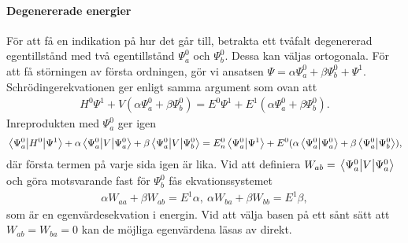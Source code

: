 \paragraph{Degenererade energier}
För att få en indikation på hur det går till, betrakta ett tvåfalt degenererad egentillstånd med två egentillstånd $\Psi_{a}^{0}$ och $\Psi_{b}^{0}$. Dessa kan väljas ortogonala. För att få störningen av första ordningen, gör vi ansatsen $\Psi = \alpha\Psi_{a}^{0} + \beta\Psi_{b}^{0} + \Psi^{1}$. Schrödingerekvationen ger enligt samma argument som ovan att
\begin{align*}
	H^{0}\Psi^{1} + V(\alpha\Psi_{a}^{0} + \beta\Psi_{b}^{0}) = E^{0}\Psi^{1} + E^{1}(\alpha\Psi_{a}^{0} + \beta\Psi_{b}^{0}).
\end{align*}
Inreprodukten med $\Psi_{a}^{0}$ ger igen
\begin{align*}
	\mel{\Psi_{a}^{0}}{H^{0}}{\Psi^{1}} + \alpha\mel{\Psi_{a}^{0}}{V}{\Psi_{a}^{0}} + \beta\mel{\Psi_{a}^{0}}{V}{\Psi_{b}^{0}} = E_{n}^{0}\braket{\Psi_{a}^{0}}{\Psi^{1}} + E^{0}(\alpha\braket{\Psi_{a}^{0}}{\Psi_{a}^{0}} + \beta\braket{\Psi_{a}^{0}}{\Psi_{b}^{0}}),
\end{align*}
där första termen på varje sida igen är lika. Vid att definiera $W_{ab} = \mel{\Psi_{a}^{0}}{V}{\Psi_{a}^{0}}$ och göra motsvarande fast för $\Psi_{b}^{0}$ fås ekvationssystemet
\begin{align*}
	\alpha W_{aa} + \beta W_{ab} = E^{1}\alpha,\ \alpha W_{ba} + \beta W_{bb} = E^{1}\beta,
\end{align*}
som är en egenvärdesekvation i energin. Vid att välja basen på ett sånt sätt att $W_{ab} = W_{ba} = 0$ kan de möjliga egenvärdena läsas av direkt.